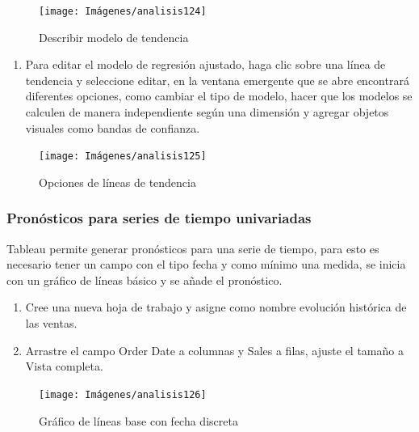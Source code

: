 \documentclass[
]{book}
\providecommand{\tightlist}{%
  \setlength{\itemsep}{0pt}\setlength{\parskip}{0pt}}
\begin{document}
\begin{figure}

{\centering \texttt{[image: Imágenes/analisis124]} 

}

\caption{Describir modelo de tendencia}\label{fig:paso9dispersion-fig}
\end{figure}

\begin{enumerate}
\def\labelenumi{\arabic{enumi}.}
\setcounter{enumi}{9}
\tightlist
\item
  Para editar el modelo de regresión ajustado, haga clic sobre una línea de tendencia y seleccione editar, en la ventana emergente que se abre encontrará diferentes opciones, como cambiar el tipo de modelo, hacer que los modelos se calculen de manera independiente según una dimensión y agregar objetos visuales como bandas de confianza.
\end{enumerate}

\begin{figure}

{\centering \texttt{[image: Imágenes/analisis125]} 

}

\caption{Opciones de líneas de tendencia}\label{fig:paso10dispersion-fig}
\end{figure}

\hypertarget{pronuxf3sticos-para-series-de-tiempo-univariadas}{%
\subsubsection{Pronósticos para series de tiempo univariadas}\label{pronuxf3sticos-para-series-de-tiempo-univariadas}}

Tableau permite generar pronósticos para una serie de tiempo, para esto es necesario tener un campo con el tipo fecha y como mínimo una medida, se inicia con un gráfico de líneas básico y se añade el pronóstico.

\begin{enumerate}
\def\labelenumi{\arabic{enumi}.}
\item
  Cree una nueva hoja de trabajo y asigne como nombre evolución histórica de las ventas.
\item
  Arrastre el campo Order Date a columnas y Sales a filas, ajuste el tamaño a Vista completa.
\end{enumerate}

\begin{figure}

{\centering \texttt{[image: Imágenes/analisis126]} 

}

\caption{Gráfico de líneas base con fecha discreta}\label{fig:paso2pronosticos-fig}
\end{figure}
\end{document}
